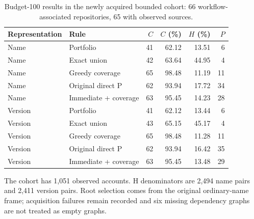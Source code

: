 \begin{table}[t]
\centering
\footnotesize
\caption{Budget-100 results in the newly acquired bounded cohort: 66 workflow-associated repositories, 65 with observed sources.}
\label{tab:revision_replication}
\begin{tabular}{llrrrr}
\toprule
Representation & Rule & $C$ & $C$ (\%) & $H$ (\%) & $P$\\
\midrule
Name & Portfolio & 41 & 62.12 & 13.51 & 6\\
Name & Exact union & 42 & 63.64 & 44.95 & 4\\
Name & Greedy coverage & 65 & 98.48 & 11.19 & 11\\
Name & Original direct P & 62 & 93.94 & 17.72 & 34\\
Name & Immediate + coverage & 63 & 95.45 & 14.23 & 28\\
Version & Portfolio & 41 & 62.12 & 13.44 & 6\\
Version & Exact union & 43 & 65.15 & 45.17 & 4\\
Version & Greedy coverage & 65 & 98.48 & 11.28 & 11\\
Version & Original direct P & 62 & 93.94 & 16.42 & 35\\
Version & Immediate + coverage & 63 & 95.45 & 13.48 & 29\\
\bottomrule
\end{tabular}
\par\smallskip\begin{minipage}{0.98\textwidth}\footnotesize The cohort has 1,051 observed accounts. H denominators are 2,494 name pairs and 2,411 version pairs. Root selection comes from the original ordinary-name frame; acquisition failures remain recorded and six missing dependency graphs are not treated as empty graphs.\end{minipage}
\end{table}
